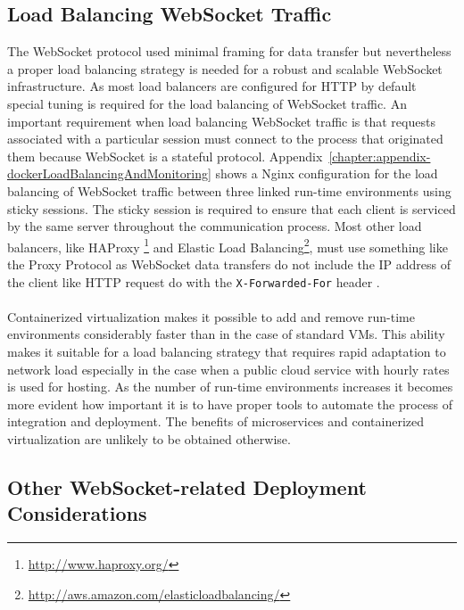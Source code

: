 \subsection{Load Balancing WebSocket Traffic}

The WebSocket protocol used minimal framing for data transfer but nevertheless a proper load balancing strategy is needed for a robust and scalable WebSocket infrastructure. As most load balancers are configured for HTTP by default special tuning is required for the load balancing of WebSocket traffic. An important requirement when load balancing WebSocket traffic is that requests associated with a particular session must connect to the process that originated them because WebSocket is a stateful protocol. Appendix~\ref{chapter:appendix-dockerLoadBalancingAndMonitoring} shows a Nginx configuration for the load balancing of WebSocket traffic between three linked run-time environments using sticky sessions. The sticky session is required to ensure that each client is serviced by the same server throughout the communication process. Most other load balancers, like HAProxy \footnote{\url{http://www.haproxy.org/}} and Elastic Load Balancing\footnote{\url{http://aws.amazon.com/elasticloadbalancing/}}, must use something like the Proxy Protocol as WebSocket data transfers do not include the IP address of the client like HTTP request do with the \texttt{X-Forwarded-For} header \cite{modard2015websocket}.
\\ \\
Containerized virtualization makes it possible to add and remove run-time environments considerably faster than in the case of standard VMs. This ability makes it suitable for a load balancing strategy that requires rapid adaptation to network load especially in the case when a public cloud service with hourly rates is used for hosting. As the number of run-time environments increases it becomes more evident how important it is to have proper tools to automate the process of integration and deployment. The benefits of microservices and containerized virtualization are unlikely to be obtained otherwise.

\subsection{Other WebSocket-related Deployment Considerations}

